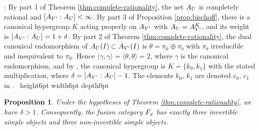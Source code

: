 \documentclass[leqno]{article}
\let\cal\relax
\newcommand{\cal}{\mathcal}
\newcommand{\qed}{\hfill \vrule height6pt  width6pt depth0pt}
\newtheorem{prop}[thm]{Proposition}
\newenvironment{proof}[1][]{\noindent {\it Proof #1} : }{\hbox{~}\qed
\smallskip
}
\numberwithin{equation}{section}
\begin{document}
\begin{proof}
By part 1 of Theorem \ref{thm:complete-rationality}, the net $\cal A_U$ is completely rational and $[\cal A_{V'} : \cal A_U] < \infty$. By part 3 of Proposition \ref{prop:bischoff}, there is a canonical hypergroup $K$ acting properly on $\cal A_{V'}$ with $\cal A_U = \cal A_{V'}^K$, and its weight is $[\cal A_{V'} : \cal A_U] = 1+\delta$. By part 2 of Theorem \ref{thm:complete-rationality}, the dual canonical endomorphism of $\cal A_U(I) \subset \cal A_{V'}(I)$ is $\theta = \pi_0 \oplus \pi_b$ with $\pi_b$ irreducible and inequivalent to $\pi_0$. Hence $\langle \gamma,\gamma\rangle = \langle\theta,\theta\rangle = 2$, where $\gamma$ is the canonical endomorphism, and by \cite[Section 4.6 p.~25]{Bis17b}, the canonical hypergroup is $K = \{k_0,k_1\}$ with the stated multiplication, where $\delta = [\cal A_{V'}:\cal A_U]-1$. The elements $k_0$, $k_1$ are denoted $c_0$, $c_1$ in \cite{Bis17b}.
\end{proof}

\begin{prop}
\label{prop:delta-big}
Under the hypotheses of Theorem \ref{thm:complete-rationality}, we have $\delta > 1$. Consequently, the fusion category $\cal F_x$ has exactly three invertible simple objects and three non-invertible simple objects.
\end{prop}
\end{document}
